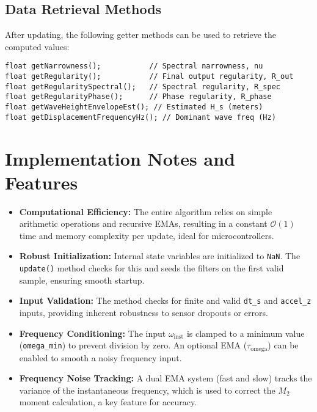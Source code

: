 \documentclass[11pt]{article}
\begin{document}
\subsection{Data Retrieval Methods}
After updating, the following getter methods can be used to retrieve the computed values:
\begin{lstlisting}[style=codestyle]
float getNarrowness();           // Spectral narrowness, nu
float getRegularity();           // Final output regularity, R_out
float getRegularitySpectral();   // Spectral regularity, R_spec
float getRegularityPhase();      // Phase regularity, R_phase
float getWaveHeightEnvelopeEst(); // Estimated H_s (meters)
float getDisplacementFrequencyHz(); // Dominant wave freq (Hz)
\end{lstlisting}

\section{Implementation Notes and Features}
\begin{itemize}
    \item \textbf{Computational Efficiency:} The entire algorithm relies on simple arithmetic operations and recursive EMAs, resulting in a constant $\mathcal{O}(1)$ time and memory complexity per update, ideal for microcontrollers.
    \item \textbf{Robust Initialization:} Internal state variables are initialized to \texttt{NaN}. The \texttt{update()} method checks for this and seeds the filters on the first valid sample, ensuring smooth startup.
    \item \textbf{Input Validation:} The method checks for finite and valid \texttt{dt\_s} and \texttt{accel\_z} inputs, providing inherent robustness to sensor dropouts or errors.
    \item \textbf{Frequency Conditioning:} The input $\omega_{\text{inst}}$ is clamped to a minimum value (\texttt{omega\_min}) to prevent division by zero. An optional EMA ($\tau_{\text{omega}}$) can be enabled to smooth a noisy frequency input.
    \item \textbf{Frequency Noise Tracking:} A dual EMA system (fast and slow) tracks the variance of the instantaneous frequency, which is used to correct the $M_2$ moment calculation, a key feature for accuracy.
\end{itemize}
\end{document}
